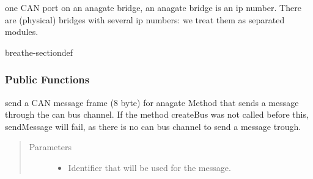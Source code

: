 \documentclass[a4paper,10pt,english]{sphinxmanual}
\begin{document}
\begin{fulllineitems}
\label{\detokenize{classesdetails:_CPPv410AnaCanScan}}%
\pysigstartmultiline
{}%
\pysigstopmultiline
\sphinxAtStartPar
one CAN port on an anagate bridge, an anagate bridge is an ip number. There are (physical) bridges with several ip numbers: we treat them as separated modules. 

\begin{sphinxuseclass}{breathe-sectiondef}\subsubsection*{Public Functions}

\begin{fulllineitems}
\label{\detokenize{classesdetails:_CPPv4N10AnaCanScan11sendMessageEshPhb}}%
\pysigstartmultiline
{}%
\pysigstopmultiline
\sphinxAtStartPar
send a CAN message frame (8 byte) for anagate Method that sends a message through the can bus channel. If the method createBus was not called before this, sendMessage will fail, as there is no can bus channel to send a message trough. 
\begin{quote}\begin{description}
\item[{Parameters}] \leavevmode\begin{itemize}
\item {} 
\sphinxAtStartPar
{} \textendash{} Identifier that will be used for the message. 


\end{itemize}
\end{description}
\end{quote}
\end{fulllineitems}
\end{sphinxuseclass}
\end{fulllineitems}
\end{document}
